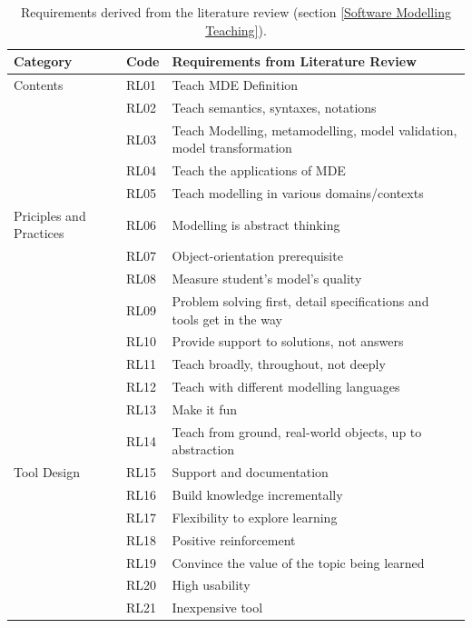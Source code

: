 \documentclass[12pt, a4paper]{report}
\begin{document}
\begin{table}[ht]\caption{Requirements derived from the literature review (section \ref{Software Modelling Teaching}).}
\label{table:requirements}
\begin{center}
\begin{tabular}{ p{2cm}p{1cm}p{10cm} } 
\hline
Category & Code & Requirements from Literature Review \\
\hline
\multirow{1}{2cm}{Contents} 
& RL01 & Teach MDE Definition \\ 
& RL02 & Teach semantics, syntaxes, notations \\ 
& RL03 & Teach Modelling, metamodelling, model validation, model transformation\\
& RL04 & Teach the applications of MDE \\
& RL05 & Teach modelling in various domains/contexts \\

\hline
\multirow{1}{2cm}{Priciples and Practices} 
& RL06 & Modelling is abstract thinking \\ 
& RL07 & Object-orientation prerequisite \\
& RL08 & Measure student's model's quality \\
& RL09 & Problem solving first, detail specifications and tools get in the way \\
& RL10 & Provide support to solutions, not answers \\ 
& RL11 & Teach broadly, throughout, not deeply \\
& RL12 & Teach with different modelling languages \\ 
& RL13 & Make it fun \\ 
& RL14 & Teach from ground, real-world objects, up to abstraction \\ 

\hline
\multirow{1}{2cm}{Tool Design}
& RL15 & Support and documentation \\
& RL16 & Build knowledge incrementally \\
& RL17 & Flexibility to explore learning \\
& RL18 & Positive reinforcement \\
& RL19 & Convince the value of the topic being learned \\ 
& RL20 & High usability \\ 
& RL21 & Inexpensive tool \\ 
\hline
\end{tabular}
\end{center}
\end{table}
\end{document}
